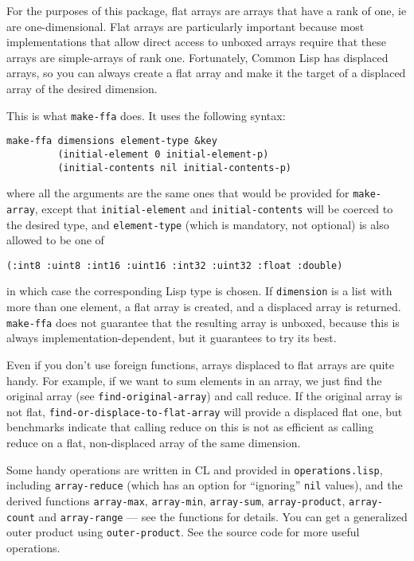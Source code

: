 \documentclass[12pt,a4paper,dvipdfm]{article}
\begin{document}
For the purposes of this package, flat arrays are arrays that have a
rank of one, ie are one-dimensional.  Flat arrays are particularly
important because most implementations that allow direct access to
unboxed arrays require that these arrays are simple-arrays of rank
one.  Fortunately, Common Lisp has displaced arrays, so you can always
create a flat array and make it the target of a displaced array of the
desired dimension.

This is what \lstinline!make-ffa! does.  It uses the following syntax:
\begin{lstlisting}
make-ffa dimensions element-type &key
         (initial-element 0 initial-element-p)
         (initial-contents nil initial-contents-p)
\end{lstlisting}
where all the arguments are the same ones that would be provided for
\lstinline!make-array!, except that \lstinline!initial-element! and
\lstinline!initial-contents! will be coerced to the desired type, and
\lstinline!element-type! (which is mandatory, not optional) is also
allowed to be one of
\begin{lstlisting}
(:int8 :uint8 :int16 :uint16 :int32 :uint32 :float :double)
\end{lstlisting}
in which case the corresponding Lisp type is chosen.  If
\lstinline!dimension! is a list with more than one element, a flat
array is created, and a displaced array is returned.
\lstinline!make-ffa! does not guarantee that the resulting array is
unboxed, because this is always implementation-dependent, but it
guarantees to try its best.

Even if you don't use foreign functions, arrays displaced to flat
arrays are quite handy.  For example, if we want to sum elements in an
array, we just find the original array (see
\lstinline!find-original-array!) and call reduce.  If the original
array is not flat, \lstinline!find-or-displace-to-flat-array! will
provide a displaced flat one, but benchmarks indicate that calling
reduce on this is not as efficient as calling reduce on a flat,
non-displaced array of the same dimension.

Some handy operations are written in CL and provided in
\verb!operations.lisp!, including \lstinline!array-reduce! (which has
an option for ``ignoring'' \lstinline!nil! values), and the derived
functions \lstinline!array-max!, \lstinline!array-min!,
\lstinline!array-sum!, \lstinline!array-product!,
\lstinline!array-count! and \lstinline!array-range! --- see the
functions for details.  You can get a generalized outer product using
\lstinline!outer-product!.  See the source code for more useful
operations.
\end{document}
